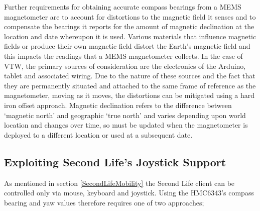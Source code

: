 Further requirements for obtaining accurate compass bearings from a MEMS magnetometer are to account for distortions to the magnetic field it senses and to compensate the bearings it reports for the amount of magnetic declination at the location and date whereupon it is used. Various materials that influence magnetic fields or produce their own magnetic field distort the Earth's magnetic field and this impacts the readings that a MEMS magnetometer collects. In the case of VTW, the primary sources of consideration are the electronics of the Arduino, tablet and associated wiring. Due to the nature of these sources and the fact that they are permanently situated and attached to the same frame of reference as the magnetometer, moving as it moves, the distortions can be mitigated using a hard iron offset approach. Magnetic declination refers to the difference between `magnetic north' and geographic `true north' and varies depending upon world location and changes over time, so must be updated when the magnetometer is deployed to a different location or used at a subsequent date.



\subsection{Exploiting Second Life's Joystick Support}

\label{exploitJoystick}

\newcommand{\ArduinoJoystickVideoFootnote}{\footnote{\url{https://www.youtube.com/watch?v=-ddtmqoGNmg}}}

\newcommand{\atmegaFootnote}{\footnote{\url{http://www.atmel.com/devices/ATMEGA16U2.aspx}}}

\newcommand{\atmegaTFootnote}{\footnote{\url{http://www.atmel.com/devices/atmega328.aspx}}}

\newcommand{\arduinousbhidFootnote}{\footnote{\url{http://hunt.net.nz/users/darran/weblog/a3599/}}}

\newcommand{\lufaFootnote}{\footnote{\url{http://www.fourwalledcubicle.com/LUFA.php}}}


As mentioned in section \ref{SecondLifeMobility} the Second Life client can be controlled only via mouse, keyboard and joystick. Using the HMC6343's compass bearing and yaw values therefore requires one of two approaches;

